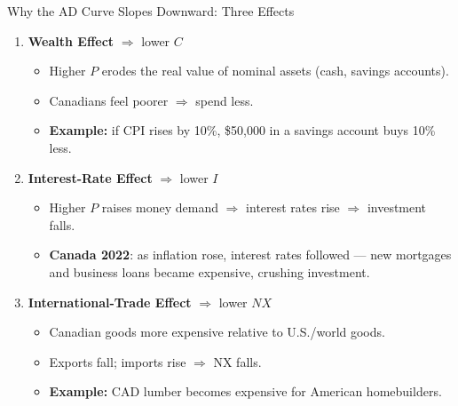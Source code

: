 \documentclass[aspectratio=169]{beamer}
\begin{document}
\begin{frame}{Why the AD Curve Slopes Downward: Three Effects}
\transfade
\begin{enumerate}
  \item \textbf{Wealth Effect} $\Rightarrow$ lower $C$
  \begin{itemize}
    \item Higher $P$ erodes the real value of nominal assets (cash, savings accounts).
    \item Canadians feel poorer $\Rightarrow$ spend less.
    \item \textbf{Example:} if CPI rises by 10\%, \$50{,}000 in a savings account buys 10\% less.
  \end{itemize}
  \item \textbf{Interest-Rate Effect} $\Rightarrow$ lower $I$
  \begin{itemize}
    \item Higher $P$ raises money demand $\Rightarrow$ interest rates rise $\Rightarrow$ investment falls.
    \item \textbf{Canada 2022}: as inflation rose, interest rates followed --- new mortgages and business loans became expensive, crushing investment.
  \end{itemize}
  \item \textbf{International-Trade Effect} $\Rightarrow$ lower $NX$
  \begin{itemize}
    \item Canadian goods more expensive relative to U.S./world goods.
    \item Exports fall; imports rise $\Rightarrow$ NX falls.
    \item \textbf{Example:} CAD lumber becomes expensive for American homebuilders.
  \end{itemize}
\end{enumerate}
\end{frame}
\end{document}
